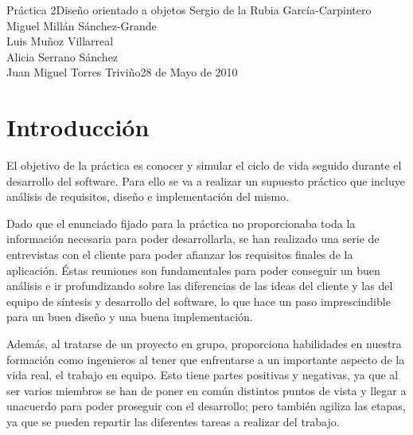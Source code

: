 \documentclass[11pt,a4paper,spanish,twoside]{book}
\begin{document}


{Práctica 2}{Diseño orientado a objetos}
{Sergio de la Rubia García-Carpintero\\Miguel Millán Sánchez-Grande\\
  Luis Muñoz Villarreal\\Alicia Serrano Sánchez\\
  Juan Miguel Torres Triviño}{28 de Mayo de 2010}


\tableofcontents

\chapter*{Introducción}
El objetivo de la práctica es conocer y simular el ciclo de vida seguido
durante el desarrollo del software. Para ello se va a realizar un supuesto
práctico que incluye análisis de requisitos, diseño e implementación del
mismo. 

Dado que el enunciado fijado para la práctica no proporcionaba toda la
información necesaria para poder desarrollarla, se han realizado
una serie de entrevistas con el cliente para poder afianzar los requisitos
finales de la aplicación. Éstas reuniones son fundamentales para poder
conseguir un buen análisis e ir profundizando sobre las diferencias de las
ideas del cliente y las del equipo de síntesis y desarrollo del software, lo
que hace un paso imprescindible para un buen diseño y una buena implementación.

Además, al tratarse de un proyecto en grupo, proporciona habilidades en
nuestra formación como ingenieros al tener que enfrentarse a un importante
aspecto de la vida real, el trabajo en equipo. Esto tiene partes positivas y
negativas, ya que al ser varios miembros se han de poner en común distintos
puntos de vista y llegar a unacuerdo para poder proseguir con el desarrollo;
pero también agiliza las etapas, ya que se pueden repartir las diferentes
tareas a realizar del trabajo. 
\end{document}
